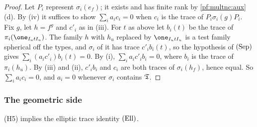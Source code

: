 \begin{proof}
Let $P_i$ represent $\sigma_i(e_f)$; it exists and has finite rank by \cref{pf:multnc:aux}(d). By (iv) it suffices to show
$\sum_ia_ic_i=0$ when $c_i$ is the trace of $P_i\sigma_i(g)P_i$. Fix $g$, let $h=f^{g}$ and $c'_i$ as in (iii). For $t$ as
above let $b_i(t)$ be the trace of $\pi_i(\one_{I_utI_u})$. The family $h$ with $h_u$ replaced by $\one_{I_utI_u}$ is a
test family spherical off the types, and $\sigma_i$ of it has trace $c'_ib_i(t)$, so the hypothesis of $\textup{(Sep)}$
gives $\sum_i(a_ic'_i)b_i(t)=0$. By (i), $\sum_ia_ic'_ib_i=0$, where $b_i$ is the trace of $\pi_i(h_u)$. By (iii) and (ii),
$c'_ib_i$ and $c_i$ are both traces of $\sigma_i(h_f)$, hence equal. So $\sum_ia_ic_i=0$, and $a_i=0$ whenever $\sigma_i$
contains $\mathfrak{T}$.
\end{proof}

\subsubsection*{The geometric side}

\begin{theorem}\label{pf:multnc:elltrace}
(H5) implies the elliptic trace identity $\textup{(Ell)}$.
\end{theorem}

